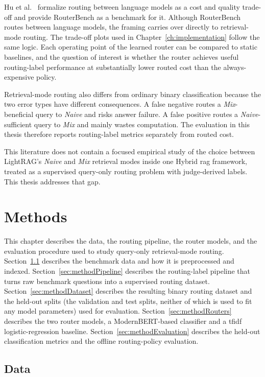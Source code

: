 \documentclass[english, bibtex]{kththesis}               %
\numberwithin{listing}{chapter}
\begin{document}
Hu et al.\ \cite{hu2024routerbench} formalize routing between language models as a cost and quality trade-off and provide RouterBench as a benchmark for it. Although RouterBench routes between language models, the framing carries over directly to retrieval-mode routing. The trade-off plots used in Chapter~\ref{ch:implementation} follow the same logic. Each operating point of the learned router can be compared to static baselines, and the question of interest is whether the router achieves useful routing-label performance at substantially lower routed cost than the always-expensive policy.

Retrieval-mode routing also differs from ordinary binary classification because the two error types have different consequences. A false negative routes a \emph{Mix}-beneficial query to \emph{Naive} and risks answer failure. A false positive routes a \emph{Naive}-sufficient query to \emph{Mix} and mainly wastes computation. The evaluation in this thesis therefore reports routing-label metrics separately from routed cost.

This literature does not contain a focused empirical study of the choice between LightRAG's \emph{Naive} and \emph{Mix} retrieval modes inside one Hybrid \gls{rag} framework, treated as a supervised query-only routing problem with judge-derived labels. This thesis addresses that gap.

\cleardoublepage
\chapter{Methods}
\label{ch:methods}

This chapter describes the data, the routing pipeline, the router models, and the evaluation procedure used to study query-only retrieval-mode routing. Section~\ref{sec:methodData} describes the benchmark data and how it is preprocessed and indexed. Section~\ref{sec:methodPipeline} describes the routing-label pipeline that turns raw benchmark questions into a supervised routing dataset. Section~\ref{sec:methodDataset} describes the resulting binary routing dataset and the held-out splits (the validation and test splits, neither of which is used to fit any model parameters) used for evaluation. Section~\ref{sec:methodRouters} describes the two router models, a ModernBERT-based classifier and a \gls{tfidf} logistic-regression baseline. Section~\ref{sec:methodEvaluation} describes the held-out classification metrics and the offline routing-policy evaluation.

\section{Data}
\label{sec:methodData}
\end{document}
